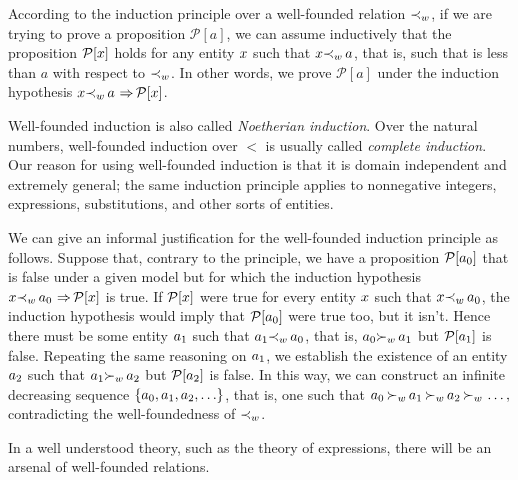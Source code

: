 \documentclass[runningheads]{llncs}
\DeclareMathOperator{\uimplies}{\Rightarrow}
\begin{document}
  
 
 According to the induction principle over a well-founded relation ${\prec}_{w}$, if we are trying to prove a proposition $\mathcal{P}[a]$, we can assume inductively that the proposition $\mathcal{P}[x]$ holds for any entity $x$ such that $x {\prec}_{w} \,a$, that is, such that  is less than $a$ with respect to ${\prec}_{w}$.  In other words, we prove $\mathcal{P}[a]$ under the induction hypothesis $\var{x} \expsub{\prec}{w} \,a  \, \uimplies \mathcal{P}[\var{x}]$.
 
 Well-founded induction is also called \emph{Noetherian induction}.  Over the natural numbers, well-founded induction over $<$ is usually called \emph{complete induction}. Our reason for using well-founded induction is that it is domain independent and extremely general; the same induction principle applies to nonnegative integers, expressions, substitutions, and other sorts of entities.
 
 We can give an informal justification for the well-founded induction principle as follows.  Suppose that, contrary to the principle, we have a proposition $\mathcal{P}[{a}_{0}]$ that is false under a given model but for which the induction hypothesis  $\var{x} \expsub{\prec}{w} \,\expsub{a}{0} \, \uimplies \mathcal{P}[\var{x}]$ is true.  If $\mathcal{P}[x]$ were true for every entity $x$ such that $x {\prec}_{w} \,{a}_{0}$, the induction hypothesis would imply that $\mathcal{P}[{a}_{0}]$ were true too, but it isn't.  Hence there must be some entity ${a}_{1}$ such that ${a}_{1} {\prec}_{w} \,{a}_{0}$, that is, ${a}_{0} {\succ}_{w} \, {a}_{1}$  but $\mathcal{P}[{a}_{1}]$ is false.  Repeating the same reasoning on ${a}_{1}$, we establish the existence of an entity  ${a}_{2}$ such that  ${a}_{1} {\succ}_{w} \, {a}_{2}$  but $\mathcal{P}[{a}_{2}]$ is false. In this way, we can construct an infinite decreasing sequence $\{{a}_{0}, {a}_{1}, {a}_{2}, \ldots \} $, that is, one such that  ${a}_{0} \, {\succ}_{w} \, {a}_{1} \, {\succ}_{w} \, {a}_{2} \, {\succ}_{w} \,\ldots ,$ contradicting the well-foundedness of ${\prec}_{w}$.
 
 In a well understood theory, such as the theory of expressions, there will be an arsenal of well-founded relations. 
\end{document}
